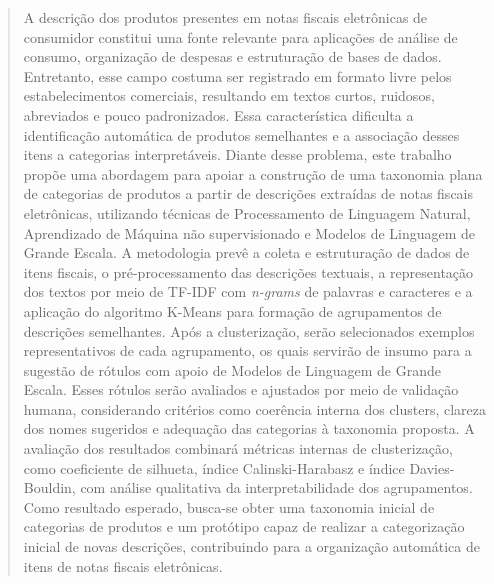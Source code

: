 \documentclass[english,brazilian]{UNISINOSmonografia}
\begin{document}
\capa
\folhaderosto






















%
\begin{abstract}
A descrição dos produtos presentes em notas fiscais eletrônicas de consumidor constitui uma fonte relevante para aplicações de análise de consumo, organização de despesas e estruturação de bases de dados. Entretanto, esse campo costuma ser registrado em formato livre pelos estabelecimentos comerciais, resultando em textos curtos, ruidosos, abreviados e pouco padronizados. Essa característica dificulta a identificação automática de produtos semelhantes e a associação desses itens a categorias interpretáveis. Diante desse problema, este trabalho propõe uma abordagem para apoiar a construção de uma taxonomia plana de categorias de produtos a partir de descrições extraídas de notas fiscais eletrônicas, utilizando técnicas de Processamento de Linguagem Natural, Aprendizado de Máquina não supervisionado e Modelos de Linguagem de Grande Escala. A metodologia prevê a coleta e estruturação de dados de itens fiscais, o pré-processamento das descrições textuais, a representação dos textos por meio de TF-IDF com \textit{n-grams} de palavras e caracteres e a aplicação do algoritmo K-Means para formação de agrupamentos de descrições semelhantes. Após a clusterização, serão selecionados exemplos representativos de cada agrupamento, os quais servirão de insumo para a sugestão de rótulos com apoio de Modelos de Linguagem de Grande Escala. Esses rótulos serão avaliados e ajustados por meio de validação humana, considerando critérios como coerência interna dos clusters, clareza dos nomes sugeridos e adequação das categorias à taxonomia proposta. A avaliação dos resultados combinará métricas internas de clusterização, como coeficiente de silhueta, índice Calinski-Harabasz e índice Davies-Bouldin, com análise qualitativa da interpretabilidade dos agrupamentos. Como resultado esperado, busca-se obter uma taxonomia inicial de categorias de produtos e um protótipo capaz de realizar a categorização inicial de novas descrições, contribuindo para a organização automática de itens de notas fiscais eletrônicas.
\end{abstract}
\end{document}
